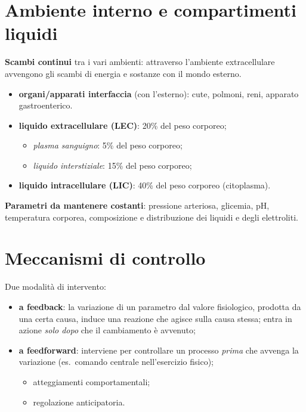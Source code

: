 \section{Ambiente interno e compartimenti liquidi}

\textbf{Scambi continui} tra i vari ambienti: attraverso l'ambiente extracellulare avvengono gli
scambi di energia e sostanze con il mondo esterno.
\begin{itemize}
  \item \textbf{organi/apparati interfaccia} (con l'esterno): cute, polmoni, reni, apparato
    gastroenterico.
\end{itemize}

\begin{itemize}
  \item \textbf{liquido extracellulare (LEC)}: 20\% del peso corporeo;
    \begin{itemize}
      \item \textit{plasma sanguigno}: 5\% del peso corporeo;
      \item \textit{liquido interstiziale}: 15\% del peso corporeo;
    \end{itemize}
  \item \textbf{liquido intracellulare (LIC)}: 40\% del peso corporeo (citoplasma).
\end{itemize}

\textbf{Parametri da mantenere costanti}: pressione arteriosa, glicemia, pH, temperatura corporea,
composizione e distribuzione dei liquidi e degli elettroliti.

\section{Meccanismi di controllo}

Due modalità di intervento:
\begin{itemize}
  \item \textbf{a feedback}: la variazione di un parametro dal valore fisiologico, prodotta da una
    certa causa, induce una reazione che agisce sulla causa stessa; entra in azione \textit{solo
    dopo} che il cambiamento è avvenuto;
  \item \textbf{a feedforward}: interviene per controllare un processo \textit{prima} che avvenga
    la variazione (es.\ comando centrale nell'esercizio fisico);
    \begin{itemize}
      \item atteggiamenti comportamentali;
      \item regolazione anticipatoria.
    \end{itemize}
\end{itemize}


